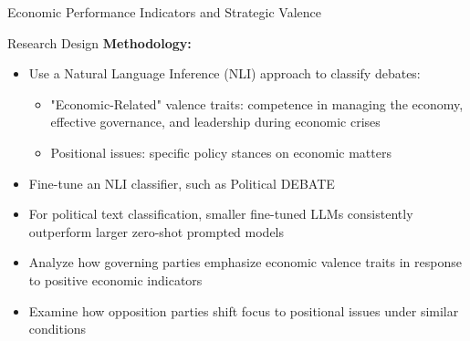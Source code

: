 \documentclass[9pt, aspectratio=169]{beamer}
\newcommand{\customcite}[1]{\textcolor{blue}{\footnotesize\parencite{#1}}}
\begin{document}
\begin{section}{Economic Performance Indicators and Strategic Valence}
\begin{frame}{Research Design}
    \textbf{Methodology:} \vspace{0.1cm}
    \begin{itemize}
        \item Use a Natural Language Inference (NLI) approach to classify debates:\vspace{0.1cm}
        \begin{itemize}
            \item "Economic-Related" valence traits: competence in managing the economy, effective governance, and leadership during economic crises \vspace{0.1cm}
            \item Positional issues: specific policy stances on economic matters \vspace{0.1cm}
        \end{itemize}
        \item Fine-tune an NLI classifier, such as Political DEBATE \customcite{burnham2024political} \vspace{0.1cm}
        \item For political text classification, smaller fine-tuned LLMs consistently outperform larger zero-shot prompted models \customcite{bucher2024finetunedsmallllmsstill} \vspace{0.1cm}
        \item Analyze how governing parties emphasize economic valence traits in response to positive economic indicators \vspace{0.1cm}
        \item Examine how opposition parties shift focus to positional issues under similar conditions
    \end{itemize}
    \vspace{0.3cm}
\end{frame}
\end{section}
\end{document}
